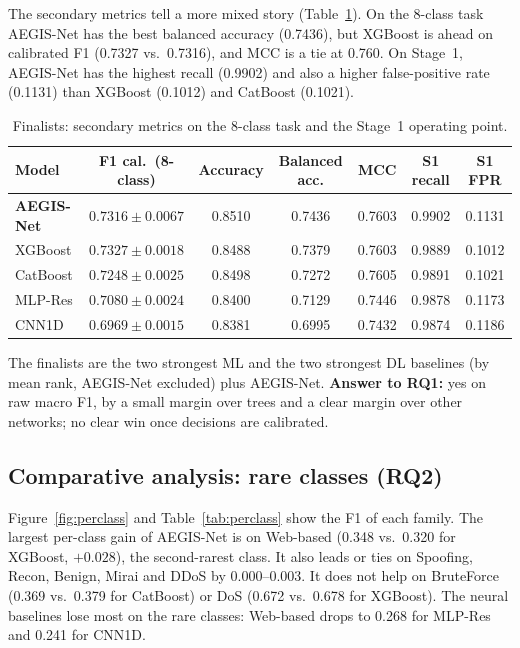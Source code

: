 \documentclass[11pt,a4paper]{article}
\newcommand{\aegis}{AEGIS-Net}
\begin{document}
The secondary metrics tell a more mixed story (Table~\ref{tab:sec}). On the 8-class task \aegis{} has the best balanced accuracy (0.7436), but XGBoost is ahead on calibrated F1 (0.7327 vs.\ 0.7316), and MCC is a tie at 0.760. On Stage~1, \aegis{} has the highest recall (0.9902) and also a higher false-positive rate (0.1131) than XGBoost (0.1012) and CatBoost (0.1021).

\begin{table}[h]
\centering\small
\caption{Finalists: secondary metrics on the 8-class task and the Stage~1 operating point.}\label{tab:sec}
\begin{tabular}{@{}lcccccc@{}}
\toprule
Model & F1 cal.\ (8-class) & Accuracy & Balanced acc. & MCC & S1 recall & S1 FPR \\
\midrule
\textbf{\aegis} & $0.7316\pm0.0067$ & 0.8510 & 0.7436 & 0.7603 & 0.9902 & 0.1131 \\
XGBoost         & $0.7327\pm0.0018$ & 0.8488 & 0.7379 & 0.7603 & 0.9889 & 0.1012 \\
CatBoost        & $0.7248\pm0.0025$ & 0.8498 & 0.7272 & 0.7605 & 0.9891 & 0.1021 \\
MLP-Res         & $0.7080\pm0.0024$ & 0.8400 & 0.7129 & 0.7446 & 0.9878 & 0.1173 \\
CNN1D           & $0.6969\pm0.0015$ & 0.8381 & 0.6995 & 0.7432 & 0.9874 & 0.1186 \\
\bottomrule
\end{tabular}
\end{table}

The finalists are the two strongest ML and the two strongest DL baselines (by mean rank, \aegis{} excluded) plus \aegis. \textbf{Answer to RQ1:} yes on raw macro F1, by a small margin over trees and a clear margin over other networks; no clear win once decisions are calibrated.

\subsection{Comparative analysis: rare classes (RQ2)}
Figure~\ref{fig:perclass} and Table~\ref{tab:perclass} show the F1 of each family. The largest per-class gain of \aegis{} is on Web-based (0.348 vs.\ 0.320 for XGBoost, $+0.028$), the second-rarest class. It also leads or ties on Spoofing, Recon, Benign, Mirai and DDoS by 0.000--0.003. It does not help on BruteForce (0.369 vs.\ 0.379 for CatBoost) or DoS (0.672 vs.\ 0.678 for XGBoost). The neural baselines lose most on the rare classes: Web-based drops to 0.268 for MLP-Res and 0.241 for CNN1D.
\end{document}

